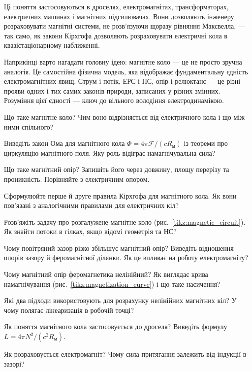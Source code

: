 \documentclass[]{ConspectBook}
\begin{document}
Ці поняття застосовуються в дроселях, електромагнітах, трансформаторах, електричних машинах і магнітних підсилювачах. Вони дозволяють інженеру розраховувати магнітні системи, не розв'язуючи щоразу рівняння Максвелла, --- так само, як закони Кірхгофа дозволяють розраховувати електричні кола в квазістаціонарному наближенні.

Наприкінці варто нагадати головну ідею: магнітне коло --- це не просто зручна аналогія. Це самостійна фізична модель, яка відображає фундаментальну єдність електромагнітних явищ. Струм і потік, ЕРС і НС, опір і релюктанс --- це різні прояви одних і тих самих законів природи, записаних у різних змінних. Розуміння цієї єдності --- ключ до вільного володіння електродинамікою.

\begin{Questions}
\begin{quizlist}
	\item Що таке магнітне коло? Чим воно відрізняється від електричного кола і що між ними спільного?
	\item Виведіть закон Ома для магнітного кола $\Phi = 4\pi\mathcal{F}/(cR_{\text{м}})$ із теореми про циркуляцію магнітного поля. Яку роль відіграє намагнічувальна сила?
	\item Що таке магнітний опір? Запишіть його через довжину, площу перерізу та проникність. Порівняйте з електричним опором.
	\item Сформулюйте перше й друге правила Кірхгофа для магнітного кола. Як вони пов'язані з аналогічними правилами для електричних кіл?
	\item Розв'яжіть задачу про розгалужене магнітне коло (рис.~\ref{tikz:magnetic_circuit}). Як знайти потоки в гілках, якщо відомі геометрія та НС?
	\item Чому повітряний зазор різко збільшує магнітний опір? Виведіть відношення опорів зазору й феромагнітної ділянки. Як це впливає на роботу електромагніту?
	\item Чому магнітний опір феромагнетика нелінійний? Як виглядає крива намагнічування (рис.~\ref{tikz:magnetization_curve}) і що таке насичення?
	\item Які два підходи використовують для розрахунку нелінійних магнітних кіл? У чому полягає лінеаризація в робочій точці?
	\item Як поняття магнітного кола застосовується до дроселя? Виведіть формулу $L = 4\pi N^2/(c^2 R_{\text{м}})$.
	\item Як розраховується електромагніт? Чому сила притягання залежить від індукції в зазорі?

\end{quizlist}
\end{Questions}
\end{document}
